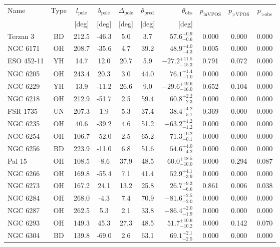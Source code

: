 \begingroup
\renewcommand{\arraystretch}{1.25}
\begin{tabular}{lcccccrccc}
	\toprule
	Name & Type & $l_\text{pole}$ & $b_\text{pole}$ & $\Delta_\text{pole}$ & $\theta_\text{pred}$ & $\theta_\text{obs}$ & $p_\text{inVPOS}$ & $p_\text{>VPOS}$ & $p_\text{>obs}$ \\
	 &  & [deg] & [deg] & [deg] & [deg] & [deg] &  &  &  \\
	\midrule
	Terzan 3 & BD & 212.5 & -46.3 & 5.0 & 3.7 & $57.6^{+0.9}_{-0.6}$ & 0.000 & 0.000 & 0.000 \\
	NGC 6171 & OH & 208.7 & -35.6 & 4.7 & 39.2 & $48.9^{+4.0}_{-4.3}$ & 0.005 & 0.000 & 0.000 \\
	ESO 452-11 & YH & 14.7 & 12.0 & 20.7 & 5.9 & $-27.2^{+11.5}_{-15.3}$ & 0.791 & 0.072 & 0.000 \\
	NGC 6205 & OH & 243.4 & 20.3 & 3.0 & 44.0 & $76.1^{+1.4}_{-1.0}$ & 0.000 & 0.000 & 0.000 \\
	NGC 6229 & YH & 13.9 & -11.2 & 26.6 & 9.0 & $-29.6^{+19.6}_{-16.0}$ & 0.652 & 0.104 & 0.000 \\
	NGC 6218 & OH & 212.9 & -51.7 & 2.5 & 59.4 & $60.8^{+2.2}_{-2.3}$ & 0.000 & 0.000 & 0.000 \\
	FSR 1735 & UN & 207.3 & 1.9 & 5.3 & 37.4 & $38.4^{+4.2}_{-5.1}$ & 0.369 & 0.000 & 0.000 \\
	NGC 6235 & OH & 40.6 & -39.2 & 4.6 & 51.2 & $-63.2^{+1.2}_{-1.2}$ & 0.000 & 0.000 & 0.000 \\
	NGC 6254 & OH & 106.7 & -52.0 & 2.5 & 65.2 & $71.3^{+0.2}_{-0.1}$ & 0.000 & 0.000 & 0.000 \\
	NGC 6256 & BD & 223.9 & -11.0 & 6.8 & 51.6 & $54.6^{+4.0}_{-4.2}$ & 0.000 & 0.000 & 0.000 \\
	Pal 15 & OH & 108.5 & -8.6 & 37.9 & 48.5 & $60.0^{+18.5}_{-10.0}$ & 0.000 & 0.294 & 0.087 \\
	NGC 6266 & OH & 169.8 & -55.4 & 7.1 & 41.4 & $52.9^{+4.1}_{-3.9}$ & 0.000 & 0.000 & 0.000 \\
	NGC 6273 & OH & 167.2 & 24.1 & 13.2 & 25.8 & $26.7^{+9.3}_{-6.6}$ & 0.861 & 0.006 & 0.038 \\
	NGC 6284 & OH & 268.0 & -4.3 & 7.4 & 70.9 & $-81.6^{+2.5}_{-2.0}$ & 0.000 & 0.000 & 0.000 \\
	NGC 6287 & OH & 262.5 & 5.3 & 2.1 & 33.8 & $-86.4^{+2.0}_{-1.9}$ & 0.000 & 0.000 & 0.000 \\
	NGC 6293 & OH & 149.3 & 45.3 & 27.3 & 48.5 & $51.7^{+10.6}_{-10.2}$ & 0.000 & 0.142 & 0.070 \\
	NGC 6304 & BD & 139.8 & -69.0 & 2.6 & 63.1 & $69.1^{+2.1}_{-2.5}$ & 0.000 & 0.000 & 0.000 \\

\end{tabular}
